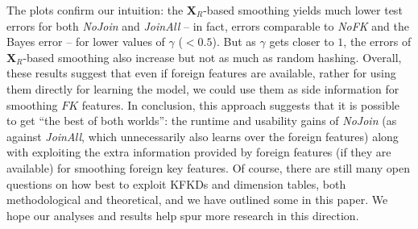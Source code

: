 \documentclass[sigconf]{acmart}
\begin{document}
The plots confirm our intuition: the $\textbf{X}_R$-based smoothing yields much lower test errors for both \textit{NoJoin} and \textit{JoinAll} -- in 
fact, errors comparable to \textit{NoFK} and the Bayes error -- for lower values of $\gamma$ ($<0.5$). But as $\gamma$ gets closer to $1$, the 
errors of $\textbf{X}_R$-based smoothing also increase but not as much as random hashing. Overall, these results suggest that even if foreign features 
are available, rather for using them directly for learning the model, we could use them as side information for smoothing $FK$ features. In conclusion,
this approach suggests that it is possible to get ``the best of both worlds'': the runtime and usability gains of \textit{NoJoin} (as against \textit{JoinAll}, 
which unnecessarily also learns over the foreign features) along with exploiting the extra information provided by foreign features (if they are available)
for smoothing foreign key features. Of course, there are still many open questions on how best to exploit KFKDs and dimension tables, both methodological
and theoretical, and we have outlined some in this paper. We hope our analyses and results help spur more research in this direction.





\end{document}
